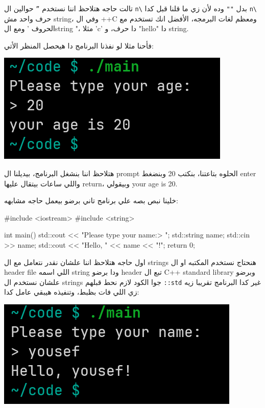 \documentclass[11pt]{article}
\let\OriginalVerbatim\verbatim
\let\endOriginalVerbatim\endverbatim
\renewenvironment{verbatim}{\begin{english}\OriginalVerbatim}{\endOriginalVerbatim\end{english}}
\begin{document}
تالت حاجه هتلاحظ اننا نستخدم \texttt{''} حوالين ال \texttt{n\textbackslash{}} بدل \texttt{""} وده لأن زي ما قلنا قبل كدا \texttt{n\textbackslash{}} حرف واحد مش string، وفي ال ++C ومعظم لغات البرمجه، الأفضل انك تستخدم مع الحروف ' ومع الstring "، مثلا 'c' دا حرف، و "hello" دا string.

فأحنا مثلا لو نفذنا البرنامج دا هيحصل المنظر الأتي:

\begin{center}
\includegraphics[width=.9\linewidth]{../images/execution_of_get_age_program.png}
\end{center}

هتلاحظ اننا بنشغل البرنامج، بيديلنا ال prompt الحلوه بتاعتنا، بنكتب 20 وبنضغط enter واللي ساعات بيتقال عليها return، وبيقولي your age is 20.

خلينا نبص بصه علي برنامج تاني برضو بيعمل حاجه مشابهه:

\begin{verbatim}
#include <iostream>
#include <string>

int main() {
    std::cout << "Please type your name:\n> ";
    std::string name;
    std::cin >> name;
    std::cout << "Hello, " << name << "!\n";
    return 0;
}
\end{verbatim}

اول حاجه هتلاحظ اننا علشان نقدر نتعامل مع ال strings هنحتاج نستخدم المكتبه او ال header file اللي اسمه string ودا برضو header تبع ال C++ standard library وبرضو علشان نستخدم ال strings جوا الكود لازم نحط قبلهم \texttt{::std} غير كدا البرنامج تقريبا زيه زي اللي فات بظبط، وتنفيذه هيبقي عامل كدا:

\begin{center}
\includegraphics[width=.9\linewidth]{../images/execution_of_get_name.png}
\end{center}
\end{document}
